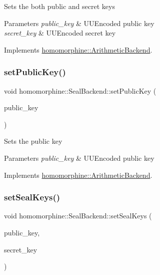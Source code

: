 Sets the both public and secret keys


\begin{DoxyParams}{Parameters}
{\em public\+\_\+key} & U\+U\+Encoded public key \\
\hline
{\em secret\+\_\+key} & U\+U\+Encoded secret key \\
\hline
\end{DoxyParams}


Implements \mbox{\hyperlink{classhomomorphine_1_1_arithmetic_backend_ac78f4b42dce3dce23edd81dba60b16c8}{homomorphine\+::\+Arithmetic\+Backend}}.

\mbox{\label{classhomomorphine_1_1_seal_backend_a6d34008acb06ff1d6743f9163fcd41fb}} 
\subsubsection{\texorpdfstring{setPublicKey()}{setPublicKey()}}
{\footnotesize\ttfamily void homomorphine\+::\+Seal\+Backend\+::set\+Public\+Key (\begin{DoxyParamCaption}\item[{string}]{public\+\_\+key }\end{DoxyParamCaption})\hspace{0.3cm}{\ttfamily [virtual]}}

Sets the public key


\begin{DoxyParams}{Parameters}
{\em public\+\_\+key} & U\+U\+Encoded public key \\
\hline
\end{DoxyParams}


Implements \mbox{\hyperlink{classhomomorphine_1_1_arithmetic_backend_af2dd2c37ed1fcd56b58baa6cb3f14e8b}{homomorphine\+::\+Arithmetic\+Backend}}.

\mbox{\label{classhomomorphine_1_1_seal_backend_a565461880ff401eeb2202ea5fadb8f9f}} 
\subsubsection{\texorpdfstring{setSealKeys()}{setSealKeys()}}
{\footnotesize\ttfamily void homomorphine\+::\+Seal\+Backend\+::set\+Seal\+Keys (\begin{DoxyParamCaption}\item[{Public\+Key}]{public\+\_\+key,  }\item[{Secret\+Key}]{secret\+\_\+key }\end{DoxyParamCaption})}

